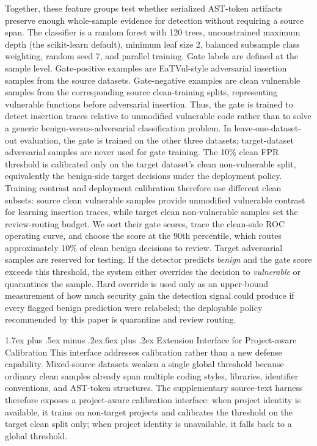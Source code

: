 \documentclass[letterpaper,twocolumn,10pt,twoside]{article}
\makeatletter
\renewcommand\subsection{\@startsection{subsection}{2}{\z@}%
  {1.7ex plus .5ex minus .2ex}{.6ex plus .2ex}%
  {\normalfont\normalsize\bfseries}}
\makeatother
\begin{document}
Together, these feature groups test whether serialized AST-token artifacts preserve enough whole-sample evidence for detection without requiring a source span. The classifier is a random forest with 120 trees, unconstrained maximum depth (the scikit-learn default), minimum leaf size 2, balanced subsample class weighting, random seed 7, and parallel training. Gate labels are defined at the sample level. Gate-positive examples are EaTVul-style adversarial insertion samples from the source datasets. Gate-negative examples are clean vulnerable samples from the corresponding source clean-training splits, representing vulnerable functions before adversarial insertion. Thus, the gate is trained to detect insertion traces relative to unmodified vulnerable code rather than to solve a generic benign-versus-adversarial classification problem. In leave-one-dataset-out evaluation, the gate is trained on the other three datasets; target-dataset adversarial samples are never used for gate training. The 10\% clean FPR threshold is calibrated only on the target dataset's clean non-vulnerable split, equivalently the benign-side target decisions under the deployment policy. Training contrast and deployment calibration therefore use different clean subsets: source clean vulnerable samples provide unmodified vulnerable contrast for learning insertion traces, while target clean non-vulnerable samples set the review-routing budget. We sort their gate scores, trace the clean-side ROC operating curve, and choose the score at the 90th percentile, which routes approximately 10\% of clean benign decisions to review. Target adversarial samples are reserved for testing. If the detector predicts \textit{benign} and the gate score exceeds this threshold, the system either overrides the decision to \textit{vulnerable} or quarantines the sample. Hard override is used only as an upper-bound measurement of how much security gain the detection signal could produce if every flagged benign prediction were relabeled; the deployable policy recommended by this paper is quarantine and review routing.

\subsection{Extension Interface for Project-aware Calibration}
This interface addresses calibration rather than a new defense capability. Mixed-source datasets weaken a single global threshold because ordinary clean samples already span multiple coding styles, libraries, identifier conventions, and AST-token structures. The supplementary source-text harness therefore exposes a project-aware calibration interface: when project identity is available, it trains on non-target projects and calibrates the threshold on the target clean split only; when project identity is unavailable, it falls back to a global threshold.
\end{document}
